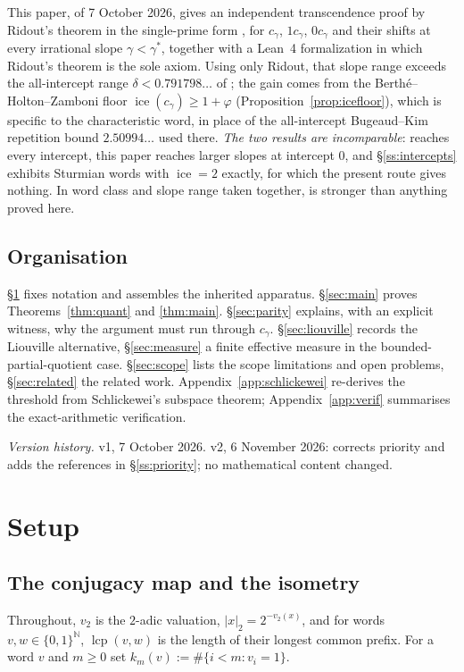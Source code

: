 \documentclass[11pt,reqno]{amsart}
\theoremstyle{plain}
\theoremstyle{definition}
\DeclareMathOperator{\lcp}{lcp}
\DeclareMathOperator{\ice}{ice}
\newcommand{\N}{\mathbb{N}}
\newcommand{\gs}{\gamma^{*}}
\newcommand{\vtwo}{v_2}
\begin{document}
This paper, of 7 October 2026, gives an independent transcendence proof by Ridout's theorem in the
single-prime form \cite[Theorem 1.3]{BK18}, for $c_\gamma$, $1c_\gamma$, $0c_\gamma$ and their
shifts at every irrational slope $\gamma<\gs$, together with a Lean~4 formalization
\cite{DJlean} in which Ridout's theorem is the sole axiom. Using only Ridout, that slope range exceeds the
all-intercept range $\delta<0.791798\ldots$ of \cite[Theorem 4.4]{Allikvere26}; the gain comes
from the Berth\'e--Holton--Zamboni floor $\ice(c_\gamma)\ge1+\varphi$
(Proposition~\ref{prop:icefloor}), which is specific to the characteristic word, in place of the
all-intercept Bugeaud--Kim repetition bound $2.50994\ldots$ used there. \emph{The two results
are incomparable}: \cite[Theorem 4.4]{Allikvere26} reaches every intercept, this paper reaches
larger slopes at intercept $0$, and \S\ref{ss:intercepts} exhibits Sturmian words with
$\ice=2$ exactly, for which the present route gives nothing. In word class and slope range taken
together, \cite[Theorem 5.4]{Allikvere26} is stronger than anything proved here.


\subsection{Organisation}
\S\ref{sec:setup} fixes notation and assembles the inherited apparatus. \S\ref{sec:main} proves
Theorems~\ref{thm:quant} and \ref{thm:main}. \S\ref{sec:parity} explains, with an explicit witness,
why the argument must run through $c_\gamma$. \S\ref{sec:liouville} records the Liouville
alternative, \S\ref{sec:measure} a finite effective measure in the bounded-partial-quotient case.
\S\ref{sec:scope} lists the scope limitations and open problems, \S\ref{sec:related} the related
work. Appendix~\ref{app:schlickewei} re-derives the threshold from Schlickewei's subspace theorem;
Appendix~\ref{app:verif} summarises the exact-arithmetic verification.

\medskip
\noindent
\emph{Version history.} v1, 7 October 2026. v2, 6 November 2026: corrects priority and adds the
references in \S\ref{ss:priority}; no mathematical content changed.

\section{Setup}\label{sec:setup}

\subsection{The conjugacy map and the isometry}
Throughout, $\vtwo$ is the $2$-adic valuation, $|x|_2=2^{-\vtwo(x)}$, and for words
$v,w\in\{0,1\}^{\N}$, $\lcp(v,w)$ is the length of their longest common prefix. For a word $v$ and
$m\ge0$ set $k_m(v):=\#\{i<m:v_i=1\}$.
\end{document}
